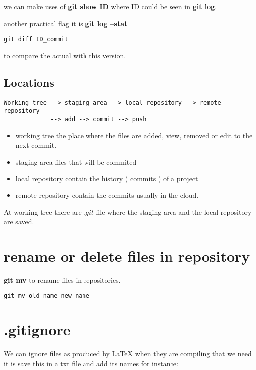 \documentclass[10pt,a4paper]{article}
\begin{document}
we can make uses of \textbf{git show ID}
where ID could be seen in \textbf{git log}.


another practical flag it is \textbf{git log --stat}


\begin{verbatim}
git diff ID_commit
\end{verbatim}
to compare the actual with this version.



\subsection{Locations}

\begin{verbatim}
Working tree --> staging area --> local repository --> remote repository
             --> add --> commit --> push
\end{verbatim}

\begin{itemize}
\item working tree the place where the files are added, view, removed or edit to the next commit.
\item staging area files that will be commited 
\item local repository contain the history ( commits ) of a project
\item remote repository contain the commits usually in the cloud.

\end{itemize}

At working tree there are $.git$ file where the staging area and the local repository are saved.

\section{rename or delete files in repository}

\textbf{git mv} to rename files in repositories.

\begin{verbatim}
git mv old_name new_name
\end{verbatim}



\section{.gitignore}

We can ignore files as produced by LaTeX when they are compiling that we need it is save this in a txt file and add its names for instance:
\end{document}
